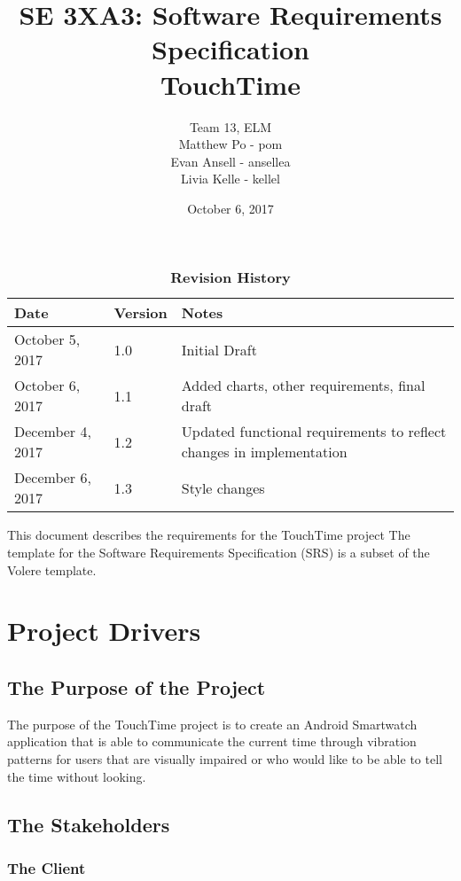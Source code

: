 \documentclass[12pt, titlepage]{article}
\title{SE 3XA3: Software Requirements Specification\\TouchTime}
\author{Team 13, ELM
        \\ Matthew Po - pom
        \\ Evan Ansell - ansellea
        \\ Livia Kelle - kellel
}
\date{October 6, 2017}
\begin{document}
\maketitle

\tableofcontents
\listoftables
\listoffigures

\begin{table}[bp]
\caption{\bf Revision History}
\begin{tabularx}{\textwidth}{p{4cm}p{2cm}X}
\toprule {\bf Date} & {\bf Version} & {\bf Notes}\\
\midrule
October 5, 2017 & 1.0 & Initial Draft\\
October 6, 2017 & 1.1 & Added charts, other requirements, final draft\\
December 4, 2017 & 1.2 & Updated functional requirements to reflect changes in implementation\\
December 6, 2017 & 1.3 & Style changes\\

\bottomrule
\end{tabularx}
\end{table}

\newpage


This document describes the requirements for the TouchTime project The template for the Software
Requirements Specification (SRS) is a subset of the Volere
template.  

\section{Project Drivers}

\subsection{The Purpose of the Project}
The purpose of the TouchTime project is to create an Android Smartwatch application that is able to communicate the current time through vibration patterns for users that are visually impaired or who would like to be able to tell the time without looking.

\subsection{The Stakeholders}

\subsubsection{The Client}
\end{document}
